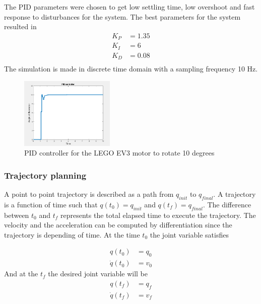 The PID parameters were chosen to get low settling time, low overshoot and fast response to disturbances for the system. The best parameters for the system resulted in 
\begin{equation}
    \begin{split}
        K_P & = 1.35 \\
        K_I & = 6 \\
        K_D & = 0.08 \\
    \end{split}
\end{equation}
The simulation is made in discrete time domain with a sampling frequency 10 Hz.
\begin{figure}[H]
    \centering
    \includegraphics[width=0.4\textwidth]{sections/assets/pid_motor.png}
    \caption{PID controller for the LEGO EV3 motor to rotate 10 degrees}
    \label{fig1}
\end{figure}

\subsubsection{Trajectory planning}
A point to point trajectory is described as a path from $q_{init}$ to $q_{final}$. A trajectory is a function of time such that $q(t_0) = q_{init}$ and $q(t_f) = q_{final}$. The difference between $t_0$ and $t_f$ represents the total elapsed time to execute the trajectory. The velocity and the acceleration can be computed by differentiation since the trajectory is depending of time.
At the time $t_0$ the joint variable satisfies

\begin{equation} \label{eq10}
\begin{split} 
     q(t_0) & = q_0 \\
    \dot{q}(t_0) & = v_0
\end{split}
\end{equation}
And at the $t_f$ the desired joint variable will be 
\begin{equation} \label{eq11}
\begin{split}
     q(t_f) & = q_f \\
    \dot{q}(t_f) & = v_f
\end{split}
\end{equation}

